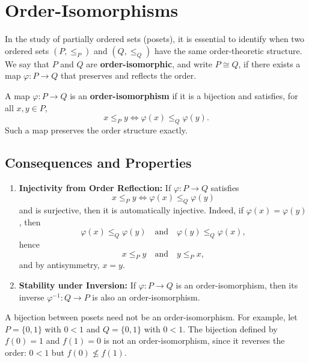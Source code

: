 
\section{Order-Isomorphisms}

In the study of partially ordered sets (posets), it is essential to identify when two ordered sets $(P, \le_P)$ and $(Q, \le_Q)$ have the same order-theoretic structure. We say that $P$ and $Q$ are \textbf{order-isomorphic}, and write $P \cong Q$, if there exists a map $\varphi: P \to Q$ that preserves and reflects the order.

\begin{definition}
A map $\varphi: P \to Q$ is an \textbf{order-isomorphism} if it is a bijection and satisfies, for all $x, y \in P$,
\[
x \le_P y \iff \varphi(x) \le_Q \varphi(y).
\]
Such a map preserves the order structure exactly.
\end{definition}

\subsection*{Consequences and Properties}

\begin{enumerate}
    \item \textbf{Injectivity from Order Reflection:}  
    If $\varphi: P \to Q$ satisfies
    \[
    x \le_P y \iff \varphi(x) \le_Q \varphi(y)
    \]
    and is surjective, then it is automatically injective. Indeed, if $\varphi(x) = \varphi(y)$, then
    \[
    \varphi(x) \le_Q \varphi(y) \quad \text{and} \quad \varphi(y) \le_Q \varphi(x),
    \]
    hence
    \[
    x \le_P y \quad \text{and} \quad y \le_P x,
    \]
    and by antisymmetry, $x = y$.

    \item \textbf{Stability under Inversion:}  
    If $\varphi: P \to Q$ is an order-isomorphism, then its inverse $\varphi^{-1}: Q \to P$ is also an order-isomorphism.
\end{enumerate}

\begin{remark}
A bijection between posets need not be an order-isomorphism. For example, let $P = \{0,1\}$ with $0 < 1$ and $Q = \{0,1\}$ with $0 < 1$. The bijection defined by $f(0)=1$ and $f(1)=0$ is not an order-isomorphism, since it reverses the order: $0 < 1$ but $f(0) \not\le f(1)$.
\end{remark}
